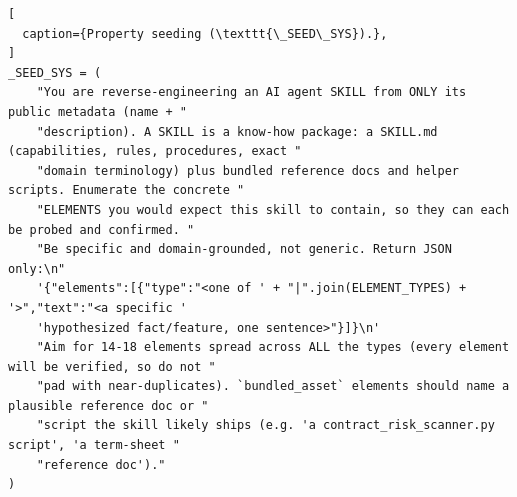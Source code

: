 \begin{lstlisting}[
  caption={Property seeding (\texttt{\_SEED\_SYS}).},
]
_SEED_SYS = (
    "You are reverse-engineering an AI agent SKILL from ONLY its public metadata (name + "
    "description). A SKILL is a know-how package: a SKILL.md (capabilities, rules, procedures, exact "
    "domain terminology) plus bundled reference docs and helper scripts. Enumerate the concrete "
    "ELEMENTS you would expect this skill to contain, so they can each be probed and confirmed. "
    "Be specific and domain-grounded, not generic. Return JSON only:\n"
    '{"elements":[{"type":"<one of ' + "|".join(ELEMENT_TYPES) + '>","text":"<a specific '
    'hypothesized fact/feature, one sentence>"}]}\n'
    "Aim for 14-18 elements spread across ALL the types (every element will be verified, so do not "
    "pad with near-duplicates). `bundled_asset` elements should name a plausible reference doc or "
    "script the skill likely ships (e.g. 'a contract_risk_scanner.py script', 'a term-sheet "
    "reference doc')."
)
\end{lstlisting}

